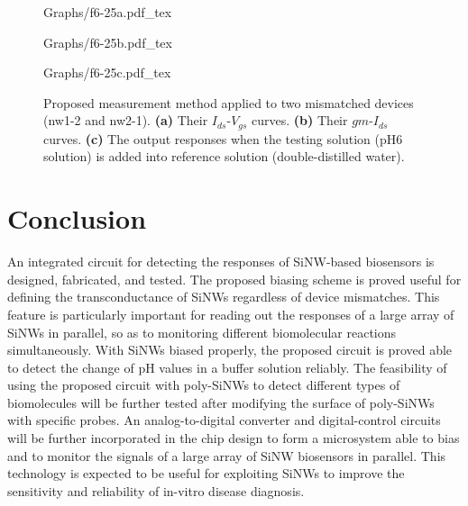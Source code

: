 \documentclass{article}
\begin{document}
\begin{figure}[!htb]

    \begin{minipage}[!htb]{0.5\linewidth}
        \centering
        \def\svgwidth{4cm}
        \fontsize{6}{8}\selectfont
         {Graphs/f6-25a.pdf_tex}
    \end{minipage}
    \hfill
    \begin{minipage}[!htb]{0.5\linewidth}
        \centering
        \def\svgwidth{5.1cm}
        \fontsize{6}{8}\selectfont
         {Graphs/f6-25b.pdf_tex}
    \end{minipage}
    \vfill
    \begin{minipage}[!hb]{1\linewidth}
        \centering
        \def\svgwidth{9cm}
        \fontsize{8}{10}\selectfont
         {Graphs/f6-25c.pdf_tex}
    \end{minipage}
    \caption{Proposed measurement method applied to two mismatched devices (nw1-2 and nw2-1).
                \textbf{(a)} Their $I_{ds}$-$V_{gs}$ curves.
                \textbf{(b)} Their $gm$-$I_{ds}$ curves.
                \textbf{(c)} The output responses when the testing solution (pH6 solution) is added into reference solution (double-distilled water).
                }
    \label{fig:dV}
\end{figure}

\section{Conclusion}
An integrated circuit for detecting the responses of SiNW-based biosensors
is designed, fabricated, and tested.
The proposed biasing scheme is proved useful for defining the transconductance of SiNWs regardless of device mismatches.
This feature is particularly important for reading out the responses of a large array of SiNWs in parallel,
so as to monitoring different biomolecular reactions simultaneously.
With SiNWs biased properly, the proposed circuit is proved able to detect the change of pH values in a buffer solution
reliably. The feasibility of using the proposed circuit with poly-SiNWs to detect different types of biomolecules
will be further tested after modifying the surface of poly-SiNWs with specific probes.
An analog-to-digital converter and digital-control circuits will be further incorporated in the chip design
to form a microsystem able to bias and to monitor the signals of a large array of SiNW biosensors in parallel.
This technology is expected to be useful for exploiting SiNWs to improve the sensitivity and reliability of
 in-vitro disease diagnosis.
\end{document}
